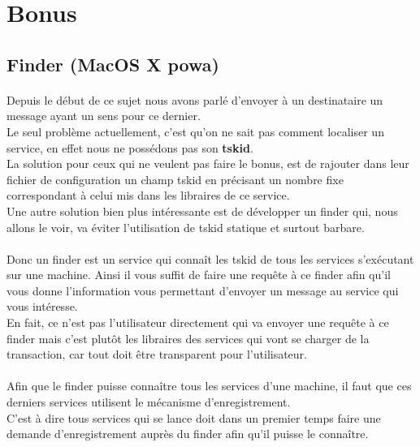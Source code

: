 \documentclass[10pt,a4wide]{article}
\begin{document}
\section{Bonus}

\subsection{Finder (MacOS X powa)}

\paragraph{}

Depuis le d\'ebut de ce sujet nous avons parl\'e d'envoyer \`a un destinataire un message ayant un sens pour ce dernier.\\
Le seul probl\`eme actuellement, c'est qu'on ne sait pas comment localiser un service, en effet nous ne poss\'edons pas son
\textbf{tskid}.\\
La solution pour ceux qui ne veulent pas faire le bonus, est de rajouter dans leur fichier de configuration un champ tskid en
pr\'ecisant un nombre fixe correspondant \`a celui mis dans les libraires de ce service.\\
Une autre solution bien plus int\'eressante est de d\'evelopper un finder qui, nous allons le voir, va \'eviter l'utilisation
de tskid statique et surtout barbare.

\paragraph{}

Donc un finder est un service qui conna\^it les tskid de tous les services s'ex\'ecutant sur une machine. Ainsi il vous suffit
de faire une requ\^ete \`a ce finder afin qu'il vous donne l'information vous permettant d'envoyer un message au service qui
vous int\'eresse.\\
En fait, ce n'est pas l'utilisateur directement qui va envoyer une requ\^ete \`a ce finder mais c'est plut\^ot les libraires des services
qui vont se charger de la transaction, car tout doit \^etre transparent pour l'utilisateur.

\paragraph{}

Afin que le finder puisse conna\^itre tous les services d'une machine, il faut que ces derniers services utilisent le m\'ecanisme
d'enregistrement.\\
C'est \`a dire tous services qui se lance doit dans un premier temps faire une demande d'enregistrement aupr\`es du finder afin qu'il puisse
le conna\^itre.
\end{document}
